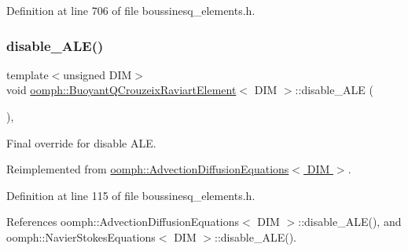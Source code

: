 Definition at line 706 of file boussinesq\+\_\+elements.\+h.

\mbox{\label{classoomph_1_1BuoyantQCrouzeixRaviartElement_a534fc134280b7447eecc4cad46b2e4c5}} 
\subsubsection{\texorpdfstring{disable\+\_\+\+A\+L\+E()}{disable\_ALE()}}
{\footnotesize\ttfamily template$<$unsigned D\+IM$>$ \\
void \hyperlink{classoomph_1_1BuoyantQCrouzeixRaviartElement}{oomph\+::\+Buoyant\+Q\+Crouzeix\+Raviart\+Element}$<$ D\+IM $>$\+::disable\+\_\+\+A\+LE (\begin{DoxyParamCaption}{ }\end{DoxyParamCaption})\hspace{0.3cm}{\ttfamily [inline]}, {\ttfamily [virtual]}}



Final override for disable A\+LE. 



Reimplemented from \hyperlink{classoomph_1_1AdvectionDiffusionEquations_aa635388e5e1139e0a1eae97ca89279d0}{oomph\+::\+Advection\+Diffusion\+Equations$<$ D\+I\+M $>$}.



Definition at line 115 of file boussinesq\+\_\+elements.\+h.



References oomph\+::\+Advection\+Diffusion\+Equations$<$ D\+I\+M $>$\+::disable\+\_\+\+A\+L\+E(), and oomph\+::\+Navier\+Stokes\+Equations$<$ D\+I\+M $>$\+::disable\+\_\+\+A\+L\+E().

\mbox{\label{classoomph_1_1BuoyantQCrouzeixRaviartElement_af551bb70aa118a8db4498f41272fe776}} 
